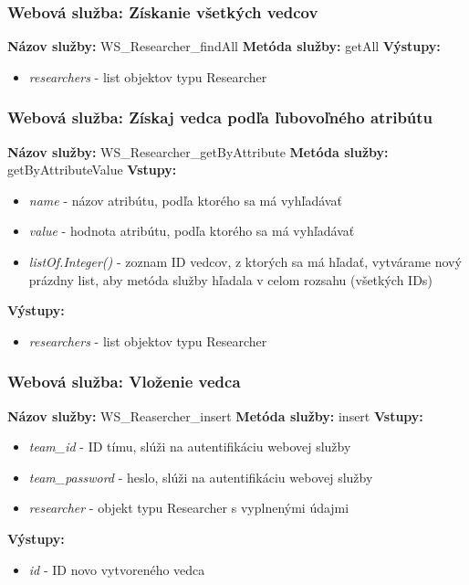 \documentclass[10pt,oneside,slovak,a4paper]{article}
\begin{document}
\subsubsection{Webová služba: Získanie všetkých vedcov}
\textbf{Názov služby:} WS\_Researcher\_findAll
\textbf{Metóda služby:} getAll
\textbf{Výstupy:}
	\begin{itemize}
		\item \textit{researchers} - list objektov typu Researcher
	\end{itemize}
	
\subsubsection{Webová služba: Získaj vedca podľa ľubovoľného atribútu}
\textbf{Názov služby:} WS\_Researcher\_getByAttribute
\textbf{Metóda služby:} getByAttributeValue
\textbf{Vstupy:}
	\begin{itemize}
		\item \textit{name} - názov atribútu, podľa ktorého sa má vyhľadávať
		\item \textit{value} - hodnota atribútu, podľa ktorého sa má vyhľadávať
		\item \textit{listOf.Integer()} - zoznam ID vedcov, z ktorých sa má hľadať, vytvárame nový prázdny list, aby metóda služby hľadala v celom rozsahu (všetkých IDs)
	\end{itemize}
\textbf{Výstupy:}
	\begin{itemize}
		\item \textit{researchers} - list objektov typu Researcher 
	\end{itemize}
	
\subsubsection{Webová služba: Vloženie vedca}
\textbf{Názov služby:} WS\_Reasercher\_insert
\textbf{Metóda služby:} insert
\textbf{Vstupy:}
	\begin{itemize}
		\item \textit{team\_id} - ID tímu, slúži na autentifikáciu webovej služby
		\item \textit{team\_password} - heslo, slúži na autentifikáciu webovej služby
		\item \textit{researcher} - objekt typu Researcher s vyplnenými údajmi
	\end{itemize}
\textbf{Výstupy:}
	\begin{itemize}
		\item \textit{id} - ID novo vytvoreného vedca
	\end{itemize}
	
\end{document}
